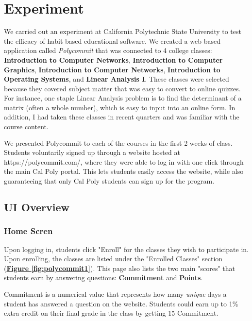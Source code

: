 \chapter{Experiment}

\par We carried out an experiment at California Polytechnic State University to test the efficacy of habit-based educational software. We created a web-based application called \textit{Polycommit} that was connected to 4 college classes: \textbf{Introduction to Computer Networks}, \textbf{Introduction to Computer Graphics}, \textbf{Introduction to Computer Networks}, \textbf{Introduction to Operating Systems}, and \textbf{Linear Analysis I}. These classes were selected because they covered subject matter that was easy to convert to online quizzes. For instance, one staple Linear Analysis problem is to find the determinant of a matrix (often a whole number), which is easy to input into an online form. In addition, I had taken these classes in recent quarters and was familiar with the course content. 

\par We presented Polycommit to each of the courses in the first 2 weeks of class. Students voluntarily signed up through a website hosted at https://polycommit.com/, where they were able to log in with one click through the main Cal Poly portal. This lets students easily access the website, while also guaranteeing that only Cal Poly students can sign up for the program.

\section{UI Overview}

\subsection{Home Scren}
\par Upon logging in, students click "Enroll" for the classes they wish to participate in. Upon enrolling, the classes are listed under the "Enrolled Classes" section (\textbf{\hyperref[fig:polycommit1]{Figure \ref*{fig:polycommit1}}}). This page also lists the two main "scores" that students earn by answering questions: \textbf{Commitment} and \textbf{Points}.

\par Commitment is a numerical value that represents how many \textit{unique} days a student has answered a question on the website. Students could earn up to 1\% extra credit on their final grade in the class by getting 15 Commitment.

